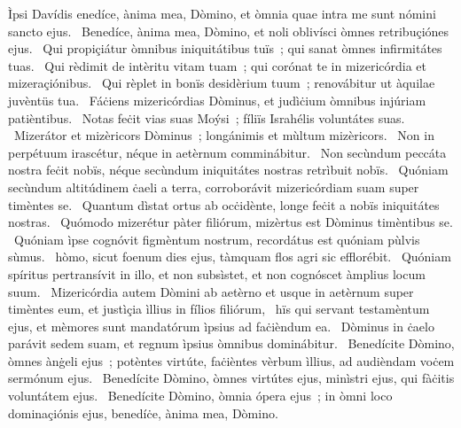 { Ìpsi Davídis}
{%
enedíce, ànima mea, Dòmino, et òmnia quae intra me sunt nómini sancto ejus. 
~Benedíce, ànima mea, Dòmino, et noli oblivísci òmnes retribuçiónes ejus. 
~Qui propiçiátur òmnibus iniquitátibus tuïs~; qui sanat òmnes infirmitátes tuas. 
~Qui rèdimit de intèritu vitam tuam~; qui corónat te in mizericórdia et mizeraçiónibus. 
~Qui rèplet in bonïs desidèrium tuum~; renovábitur ut àquilae juvèntüs tua. 
~Fáċiens mizericórdias Dòminus, et judìċium òmnibus injúriam patièntibus. 
~Notas feċit vias suas Moýsi~; fíliïs Israhélis voluntátes suas. 
~Mizerátor et mizèricors Dòminus~; longánimis et mùltum mizèricors. 
~Non in perpétuum irascétur, néque in aetèrnum comminábitur. 
~Non secùndum peccáta nostra feċit nobïs, néque secùndum iniquitátes nostras retrìbuit nobïs. 
~Quóniam secùndum altitúdinem ċaeli a terra, corroborávit mizericórdiam suam super timèntes se. 
~Quantum dìstat ortus ab ocċidènte, longe feċit a nobïs iniquitátes nostras. 
~Quómodo mizerétur pàter filiórum, mizèrtus est Dòminus timèntibus se. 
~Quóniam ìpse cognóvit figmèntum nostrum, recordátus est quóniam pùlvis sùmus. 
~hòmo, sicut foenum dies ejus, tàmquam flos agri sic efflorébit. 
~Quóniam spíritus pertransívit in illo, et non subsìstet, et non cognóscet àmplius locum suum. 
~Mizericórdia autem Dòmini ab aetèrno et usque in aetèrnum super timèntes eum, et justìçia ìllius in fílios filiórum, 
~hïs qui servant testamèntum ejus, et mèmores sunt mandatórum ìpsius ad faċièndum ea. 
~Dòminus in ċaelo parávit sedem suam, et regnum ìpsius òmnibus dominábitur. 
~Benedícite Dòmino, òmnes ànġeli ejus~; potèntes virtúte, faċièntes vèrbum ìllius, ad audièndam voċem sermónum ejus. 
~Benedícite Dòmino, òmnes virtútes ejus, minìstri ejus, qui fàċitis voluntátem ejus. 
~Benedícite Dòmino, òmnia ópera ejus~; in òmni loco dominaçiónis ejus, benedíċe, ànima mea, Dòmino. 
}
